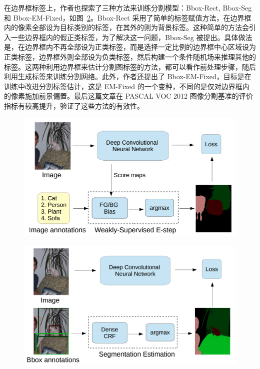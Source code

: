 在边界框标签上，作者也探索了三种方法来训练分割模型：Bbox-Rect, Bbox-Seg 和 Bbox-EM-Fixed，如图~\ref{c2_fig2}。Bbox-Rect 采用了简单的标签赋值方法，在边界框内的像素全部设为目标类别的标签，在其外的则为背景标签。这种简单的方法会引入一些边界框内的假正类标签，为了解决这一问题，Bbox-Seg 被提出。具体做法是，在边界框内不再全部设为正类标签，而是选择一定比例的边界框中心区域设为正类标签，边界框外则全部设为负类标签，然后构建一个条件随机场来推理其他的标签。这两种利用边界框来估计分割图标签的方法，都可以看作前处理步骤，随后利用生成标签来训练分割网络。此外，作者还提出了 Bbox-EM-Fixed，目标是在训练中改进分割标签估计，这是 EM-Fixed 的一个变种，不同的是仅对边界框内的像素施加前景偏置。最后这篇文章在 PASCAL VOC 2012 图像分割基准的评价指标有较高提升，验证了这些方法的有效性。


    \begin{figure}[tbp]
        \centering 
        \includegraphics[width=1.0\textwidth]{img/c2/rel_a1.png}
        \label{c2_fig1}
    \end{figure}

    \begin{figure}[tbp]
        \centering 
        \includegraphics[width=1.0\textwidth]{img/c2/rel_a2.png}
        \label{c2_fig2}
    \end{figure}

